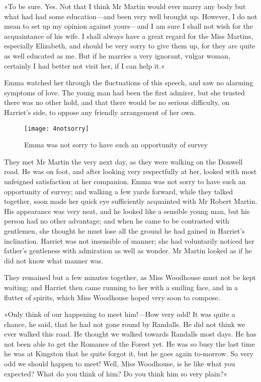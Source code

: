 »To be sure. Yes. Not that I think Mr Martin would ever marry any body but what had had some education—and been very well brought up. However, I do not mean to set up my opinion against yours—and I am sure I shall not wish for the acquaintance of his wife. I shall always have a great regard for the Miss Martins, especially Elizabeth, and should be very sorry to give them up, for they are quite as well educated as me. But if he marries a very ignorant, vulgar woman, certainly I had better not visit her, if I can help it.«

Emma watched her through the fluctuations of this speech, and saw no alarming symptoms of love. The young man had been the first admirer, but she trusted there was no other hold, and that there would be no serious difficulty, on Harriet's side, to oppose any friendly arrangement of her own.

\begin{figure}[tbph]
\centering
\texttt{[image: 4notsorry]}
\caption{Emma was not sorry to have such an opportunity of survey}
\end{figure}

They met Mr Martin the very next day, as they were walking on the Donwell road. He was on foot, and after looking very respectfully at her, looked with most unfeigned satisfaction at her companion. Emma was not sorry to have such an opportunity of survey; and walking a few yards forward, while they talked together, soon made her quick eye sufficiently acquainted with Mr Robert Martin. His appearance was very neat, and he looked like a sensible young man, but his person had no other advantage; and when he came to be contrasted with gentlemen, she thought he must lose all the ground he had gained in Harriet's inclination. Harriet was not insensible of manner; she had voluntarily noticed her father's gentleness with admiration as well as wonder. Mr Martin looked as if he did not know what manner was.

They remained but a few minutes together, as Miss Woodhouse must not be kept waiting; and Harriet then came running to her with a smiling face, and in a flutter of spirits, which Miss Woodhouse hoped very soon to compose.

»Only think of our happening to meet him!—How very odd! It was quite a chance, he said, that he had not gone round by Randalls. He did not think we ever walked this road. He thought we walked towards Randalls most days. He has not been able to get the Romance of the Forest yet. He was so busy the last time he was at Kingston that he quite forgot it, but he goes again to-morrow. So very odd we should happen to meet! Well, Miss Woodhouse, is he like what you expected? What do you think of him? Do you think him so very plain?«

